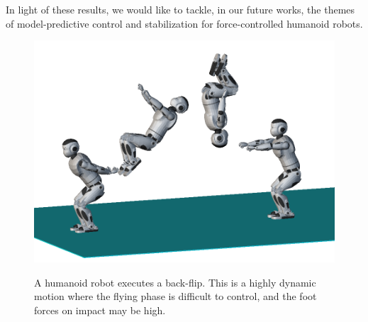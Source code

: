 In light of these results, we would like to tackle, in our future
works, the themes of model-predictive control and stabilization for
force-controlled humanoid robots.

\begin{figure}
  \centering
      {\includegraphics[width = 0.8\linewidth]
        {src/chap4-conclusion/romeo-back-flip.png}}
      \caption{A humanoid robot executes a back-flip. This is a highly
        dynamic motion where the flying phase is difficult to control,
        and the foot forces on impact may be high.}
      \label{fig:chap4-romeo-back-flip}
\end{figure}
